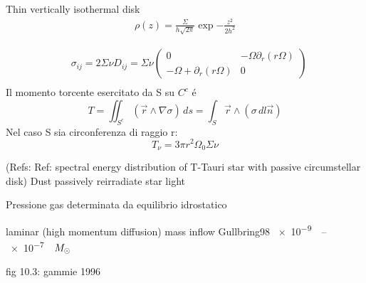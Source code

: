 \begin{workout}
	Thin vertically isothermal disk
	\begin{align}
	&\rho(z)=\frac{\Sigma}{h\sqrt{2\pi}}\exp{-\frac{z^2}{2h^2}}
	&
	\end{align}
\end{workout}

\begin{workout}
	
\end{workout}

\begin{workout}
	\begin{align}
	&\sigma_{ij}=2\Sigma\nu D_{ij}=\Sigma\nu\begin{pmatrix}0&-\Omega\partial_r(r\Omega)\\-\Omega+\partial_r(r\Omega)&0
	\end{pmatrix}\\
	\end{align}
	Il momento torcente esercitato da S su $C^c$ \'e
	\begin{equation}
	T=\iint_{S^c}(\vec{r}\wedge\nabla\sigma)\,ds=\int_S\vec{r}\wedge(\sigma\,dl\vec{n})
	\end{equation}
	Nel caso S sia circonferenza di raggio r:
	\begin{equation}
	T_{\nu}=3\pi r^2\Omega_0\Sigma\nu
	\end{equation}
\end{workout}

\begin{workout}
	(Refs: Ref: spectral energy distribution of T-Tauri star with passive circumstellar disk)
	Dust passively reirradiate star light
\end{workout}

\begin{workout}
	Pressione gas determinata da equilibrio idrostatico
\end{workout}

\begin{workout}
	laminar (high momentum diffusion)
	mass inflow Gullbring98 \SIrange{e-9}{e-7}{\per\year}$M_{\odot}{}$
\end{workout}
\begin{workout}[MRI]
	fig 10.3:
	gammie 1996
\end{workout}

